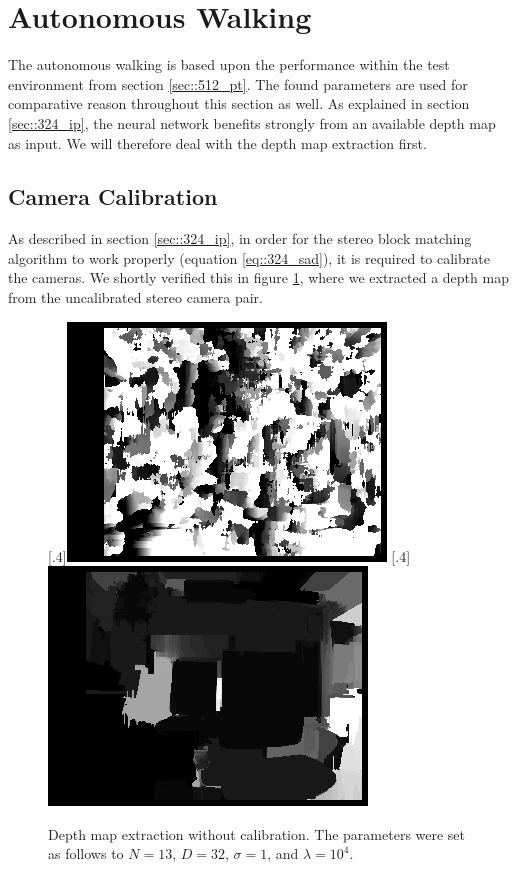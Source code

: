\section{Autonomous Walking}
\label{sec::52_aw}
The autonomous walking is based upon the performance within the test environment from section \ref{sec::512_pt}. The found parameters are used for comparative reason throughout this section as well. As explained in section \ref{sec::324_ip}, the neural network benefits strongly from an available depth map as input. We will therefore deal with the depth map extraction first.
\subsection{Camera Calibration}
As described in section \ref{sec::324_ip}, in order for the stereo block matching algorithm to work properly (equation \ref{eq::324_sad}), it is required to calibrate the cameras. We shortly verified this in figure \ref{fig::521_no_calib}, where we extracted a depth map from the uncalibrated stereo camera pair.
\begin{figure}[h]
	\centering
	[.4\linewidth]{\includegraphics[scale=.3]{chapters/05_experiments/02_autonomous_walking/02_depth_map_parameter_tuning/disp_no_calib.png}}
	[.4\linewidth]{\includegraphics[scale=.3]{chapters/05_experiments/02_autonomous_walking/02_depth_map_parameter_tuning/wls_no_calib.png}}
	\caption{Depth map extraction without calibration. The parameters were set as follows to $N=13$, $D=32$, $\sigma = 1$, and $\lambda=10^4$.}
	\label{fig::521_no_calib}
\end{figure}

